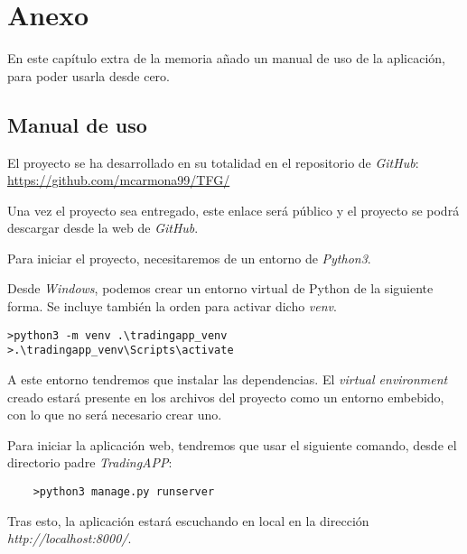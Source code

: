 \chapter{Anexo}

En este capítulo extra de la memoria añado un manual de uso de la aplicación, para poder usarla desde cero.\newline

\section{Manual de uso}

El proyecto se ha desarrollado en su totalidad en el repositorio de \textit{GitHub}: \color{blue} \href{https://github.com/mcarmona99/TFG/}{https://github.com/mcarmona99/TFG/} \color{black}\newline
	
Una vez el proyecto sea entregado, este enlace será público y el proyecto se podrá descargar desde la web de \textit{GitHub}.\newline

Para iniciar el proyecto, necesitaremos de un entorno de \textit{Python3}.\newline

Desde \textit{Windows}, podemos crear un entorno virtual de Python de la siguiente forma. Se incluye también la orden para activar dicho \textit{venv}.\newline

\begin{lstlisting}
>python3 -m venv .\tradingapp_venv
>.\tradingapp_venv\Scripts\activate
\end{lstlisting}

A este entorno tendremos que instalar las dependencias. El \textit{virtual environment} creado estará presente en los archivos del proyecto como un entorno embebido, con lo que no será necesario crear uno.\newline

Para iniciar la aplicación web, tendremos que usar el siguiente comando, desde el directorio padre \textit{TradingAPP}:\newline

\begin{lstlisting}
	>python3 manage.py runserver
\end{lstlisting}

Tras esto, la aplicación estará escuchando en local en la dirección \textit{http://localhost:8000/}.\newline

